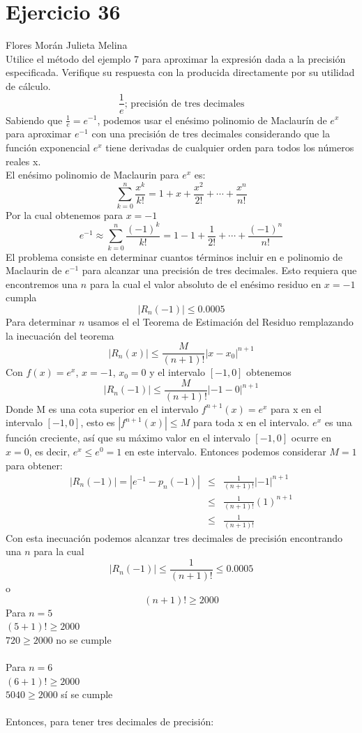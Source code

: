 \documentclass[12pt]{article}
\begin{document}
\section{Ejercicio 36} Flores Morán Julieta Melina \\

Utilice el método del ejemplo 7 para aproximar la expresión dada a la precisión especificada. Verifique su respuesta con la producida directamente por su utilidad de cálculo.
\[\frac{1}{e}\text{; precisión de tres decimales}\]
Sabiendo que $ \frac{1}{e} = e^{-1} $, podemos usar el enésimo polinomio de Maclaurín de $e^{x}$ para aproximar $e^{-1}$ con una precisión de tres decimales considerando que la función exponencial $e^{x}$ tiene derivadas de cualquier orden para todos los números reales x.\\
El enésimo polinomio de Maclaurin para $e^x$ es:
\[
\sum_{k=0}^{n}\frac{x^{k}}{k!} = 1 + x + \frac{x^{2}}{2!}+ \cdots + \frac{x^{n}}{n!}
\]
Por la cual obtenemos para $x = -1$
\[
e^{-1} \approx \sum_{k=0}^{n}\frac{(-1)^{k}}{k!} = 1 - 1 + \frac{1}{2!}+ \cdots + \frac{(-1)^{n}}{n!}
\]
El problema consiste en determinar cuantos términos incluir en e polinomio de Maclaurin de $e^{-1}$ para alcanzar una precisión de tres decimales. Esto requiera que encontremos una $n$ para la cual el valor absoluto de el enésimo residuo en $x = -1$ cumpla
\[
\left| R_n (-1) \right| \leq 0.0005
\]
Para determinar $n$ usamos el el Teorema de Estimación del Residuo 
remplazando la inecuación del teorema 
\[
\left| R_n (x)  \right|  \leq \frac{M}{(n+1)!} \left| x-x_0  \right|^{n+1}
\]
Con $f(x) = e ^{x}$, $x = -1$, $x_0 = 0$ y el intervalo $[-1, 0]$ obtenemos
\[
\left| R_n (-1)  \right|  \leq \frac{M}{(n+1)!} \left| -1-0  \right|^{n+1}
\]
Donde M es una cota superior en el intervalo $f^{n+1}(x) = e^{x}$ para x en el intervalo $[-1, 0]$, esto es $\left|f^{n+1}(x)\right| \leq M$ para toda  x en el intervalo. $e^x$ es una función creciente, así que su máximo valor en el intervalo $[-1, 0]$ ocurre en $x=0$, es decir, $e^{x} \leq e^{0} =1$ en este intervalo. Entonces podemos considerar $M = 1$ para obtener:
\begin{eqnarray}
\left| R_n (-1)  \right| = \left| e^{-1}- p_n(-1)  \right|
&\leq & \frac{1}{(n+1)!} \left| -1\right|^{n+1} \nonumber
\\
&\leq & \frac{1}{(n+1)!} (1)^{n+1} \nonumber
\\
&\leq & \frac{1}{(n+1)!}  \nonumber
\end{eqnarray}
Con esta inecuación podemos alcanzar tres decimales de precisión encontrando una $n$ para la cual
\[
\left| R_n (-1)  \right|  \leq  \frac{1}{(n+1)!} \leq 0.0005
\]
o
\[
(n+1)! \geq 2000
\]
Para $n = 5$ \\
$(5+1)! \geq 2000$ \\
$720 \geq  2000$ no se cumple \\ \\
Para $n = 6$ \\
$(6+1)! \geq 2000$ \\
$ 5040 \geq  2000$ sí se cumple \\ \\
Entonces, para tener tres decimales de precisión:
\end{document}
